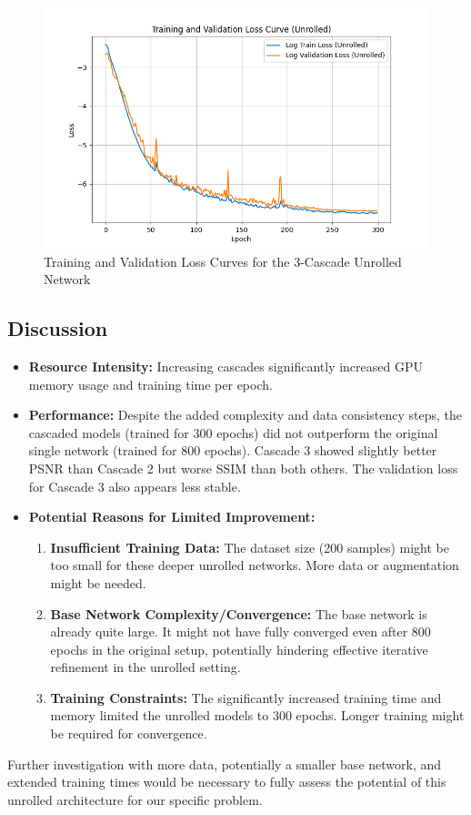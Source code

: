 \documentclass{article}
\begin{document}
\begin{figure}[H]
  \centering
  \includegraphics[width=\linewidth]{../assets/Training Loss and Validation Loss Unrolled.png}
  \caption{Training and Validation Loss Curves for the 3-Cascade Unrolled Network}
  \label{fig:loss_unrolled}
\end{figure}

\subsection{Discussion}
\begin{itemize}
  \item \textbf{Resource Intensity:} Increasing cascades significantly increased GPU memory usage and training time per epoch.
  \item \textbf{Performance:} Despite the added complexity and data consistency steps, the cascaded models (trained for 300 epochs) did not outperform the original single network (trained for 800 epochs). Cascade 3 showed slightly better PSNR than Cascade 2 but worse SSIM than both others. The validation loss for Cascade 3 also appears less stable.
  \item \textbf{Potential Reasons for Limited Improvement:}
        \begin{enumerate}
          \item \textbf{Insufficient Training Data:} The dataset size (200 samples) might be too small for these deeper unrolled networks. More data or augmentation might be needed.
          \item \textbf{Base Network Complexity/Convergence:} The base network is already quite large. It might not have fully converged even after 800 epochs in the original setup, potentially hindering effective iterative refinement in the unrolled setting.
          \item \textbf{Training Constraints:} The significantly increased training time and memory limited the unrolled models to 300 epochs. Longer training might be required for convergence.
        \end{enumerate}
\end{itemize}
Further investigation with more data, potentially a smaller base network, and extended training times would be necessary to fully assess the potential of this unrolled architecture for our specific problem.
\end{document}
